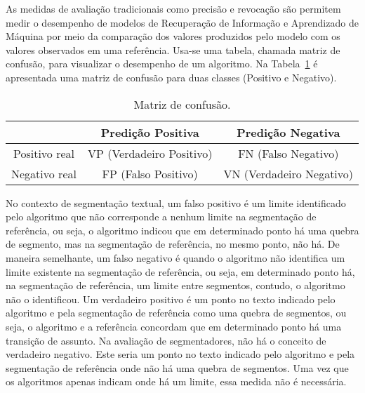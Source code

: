 


As medidas de avaliação tradicionais como precisão e revocação são permitem medir o desempenho de modelos de Recuperação de Informação e Aprendizado de Máquina por meio da comparação dos valores produzidos pelo modelo com os valores observados em uma referência. 
Usa-se uma tabela, chamada matriz de confusão, para visualizar o desempenho de um algoritmo. Na Tabela~\ref{tab:matrizconfusao} é apresentada uma matriz de confusão para duas classes (Positivo e Negativo). 

\begin{table}[!h]
\centering

\begin{tabular}{|c|c|c|}
  \hline
				& Predição Positiva        & Predição Negativa        \\ \hline
  Positivo real & VP (Verdadeiro Positivo) & FN (Falso Negativo)      \\ \hline
  Negativo real & FP (Falso Positivo)      & VN (Verdadeiro Negativo) \\ \hline

\end{tabular}

\caption{Matriz de confusão.}
\label{tab:matrizconfusao}

\end{table}


%
No contexto de segmentação textual, um falso positivo é um limite identificado pelo algoritmo que não corresponde a nenhum limite na segmentação de referência, ou seja, o algoritmo indicou que em determinado ponto há uma quebra de segmento, mas na segmentação de referência, no mesmo ponto, não há. De maneira semelhante, um falso negativo é quando o algoritmo não identifica um limite existente na segmentação de referência, ou seja, em determinado ponto há, na segmentação de referência, um limite entre segmentos, contudo, o algoritmo não o identificou.  Um verdadeiro positivo é um ponto no texto indicado pelo algoritmo e pela segmentação de referência como uma quebra de segmentos, ou seja, o algoritmo e a referência concordam que em determinado ponto há uma transição de assunto.  Na avaliação de segmentadores, não há o conceito de verdadeiro negativo. Este seria um ponto no texto indicado pelo algoritmo e pela segmentação de referência onde não há uma quebra de segmentos. Uma vez que os algoritmos apenas indicam onde há um limite, essa medida não é necessária. %


